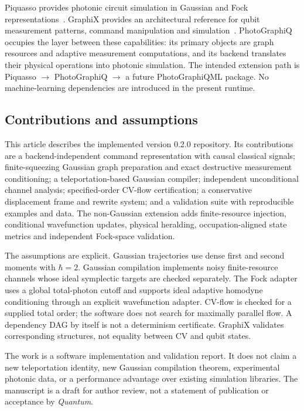 \documentclass[a4paper,twocolumn,11pt,nopdfoutputerror]{quantumarticle}
\begin{document}
Piquasso provides photonic circuit simulation in Gaussian and Fock
representations~\cite{piquasso2025}. GraphiX provides an architectural reference for
qubit measurement patterns, command manipulation and simulation~\cite{graphix2022}.
PhotoGraphiQ occupies the layer between these capabilities: its primary objects
are graph resources and adaptive measurement computations, and its backend
translates their physical operations into photonic simulation. The intended
extension path is Piquasso $\rightarrow$ PhotoGraphiQ $\rightarrow$ a future
PhotoGraphiQML package. No machine-learning dependencies are introduced in the
present runtime.

\subsection{Contributions and assumptions}

This article describes the implemented version 0.2.0 repository. Its contributions
are a backend-independent command representation with causal classical signals;
finite-squeezing Gaussian graph preparation and exact destructive measurement
conditioning; a teleportation-based Gaussian compiler; independent unconditional
channel analysis; specified-order CV-flow certification; a conservative
displacement frame and rewrite system; and a validation suite with reproducible
examples and data. The non-Gaussian extension adds finite-resource injection,
conditional wavefunction updates, physical heralding, occupation-aligned state
metrics and independent Fock-space validation.

The assumptions are explicit. Gaussian trajectories use dense first and second
moments with $\hbar=2$. Gaussian compilation implements noisy finite-resource
channels whose ideal symplectic targets are checked separately. The Fock adapter
uses a global total-photon cutoff and supports ideal adaptive homodyne
conditioning through an explicit wavefunction adapter. CV-flow is checked for a supplied total order; the software does
not search for maximally parallel flow. A dependency DAG by itself is not a
determinism certificate. GraphiX validates corresponding structures, not equality
between CV and qubit states.

The work is a software implementation and validation report. It does not claim a
new teleportation identity, new Gaussian compilation theorem, experimental
photonic data, or a performance advantage over existing simulation libraries.
The manuscript is a draft for author review, not a statement of publication or
acceptance by \emph{Quantum}.
\end{document}
